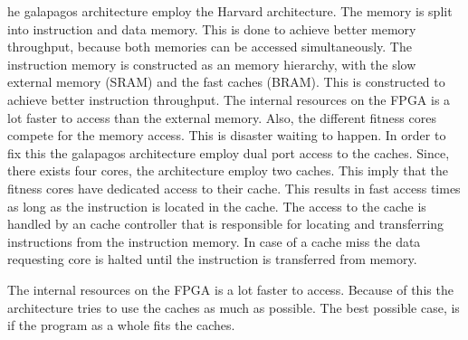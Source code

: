 he galapagos architecture employ the Harvard architecture. The memory is split into instruction and data memory. This is done to achieve better memory throughput, because both memories can be accessed simultaneously. The instruction memory is constructed as an memory hierarchy, with the slow external memory (SRAM) and the fast caches (BRAM). This is constructed to achieve better instruction throughput. The internal resources on the FPGA is a lot faster to access than the external memory. Also, the different fitness cores compete for the memory access. This is disaster waiting to happen. In order to fix this the galapagos architecture employ dual port access to the caches. Since, there exists four cores, the architecture employ two caches. This imply that the fitness cores have dedicated access to their cache. This results in fast access times as long as the instruction is located in the cache. The access to the cache is handled by an cache controller that is responsible for locating and transferring instructions from the instruction memory. In case of a cache miss the data requesting core is halted until the instruction is transferred from memory.


The internal resources on the FPGA is a lot faster to access. Because of this the architecture tries to use the caches as much as possible. The best possible case, is if the program as a whole fits the caches.  

